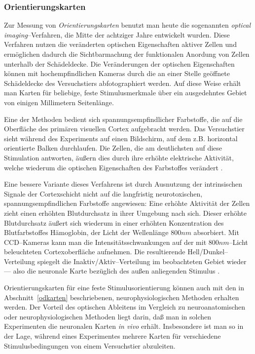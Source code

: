 \subsubsection{Orientierungskarten}

Zur Messung von \emph{Orientierungskarten} benutzt man heute die
sogenannten \emph{optical imaging}--Verfahren, die Mitte der achtziger
Jahre entwickelt wurden. Diese Verfahren nutzen die veränderten optischen
Eigenschaften aktiver Zellen und ermöglichen dadurch die Sichtbarmachung
der funktionalen Anordung von Zellen unterhalb der Schädeldecke. Die
Veränderungen der optischen Eigenschaften können mit hochempfindlichen
Kameras durch die an einer Stelle geöffnete Schädeldecke des
Versuchstiers abfotographiert werden.  Auf diese Weise erhält man Karten
für beliebige, feste Stimulusmerkmale über ein ausgedehntes Gebiet von
einigen Millimetern Seitenlänge.

Eine der Methoden bedient sich spannungsempfindlicher Farbstoffe, die auf
die Oberfläche des primären visuellen Cortex aufgebracht werden. Das
Versuchstier sieht während des Experiments auf einen Bildschirm, auf dem
z.B. horizontal orientierte Balken durchlaufen. Die Zellen, die am
deutlichsten auf diese Stimulation antworten, äußern dies durch ihre
erhöhte elektrische Aktivität, welche wiederum die optischen
Eigenschaften des Farbstoffes verändert \cite{blasdel:1986,blasdel:1992a}.

Eine bessere Variante dieses Verfahrens ist durch Ausnutzung der
intrinsischen Signale der Cortexschicht nicht auf die langfristig
neurotoxischen, spannungsempfindlichen Farbstoffe angewiesen: Eine erhöhte
Aktivität der Zellen zieht einen erhöhten Blutdurchsatz in ihrer Umgebung
nach sich. Dieser erhöhte Blutdurchsatz äußert sich wiederum in einer
erhöhten Konzentration des Blutfarbstoffes Hämoglobin, der Licht der
Wellenlänge $800nm$ absorbiert. Mit CCD--Kameras kann man die
Intensitätsschwankungen auf der mit $800nm$--Licht beleuchteten
Cortexoberfläche aufnehmen. Die resultierende Hell/Dunkel--Verteilung
spiegelt die Inaktiv/Aktiv--Verteilung im beobachteten Gebiet wieder ---
also die neuronale Karte bezüglich des außen anliegenden Stimulus
\cite{lieke:1989,grinvald:1991}.

Orientierungskarten für eine feste Stimulusorientierung können auch mit
den in Abschnitt~\ref{odkarten} beschriebenen, neurophysiologischen
Methoden erhalten werden.  Der Vorteil des optischen Ableitens im Vergleich
zu neuroanatomischen oder neurophysiologischen Methoden liegt darin, daß
man in solchen Experimenten die neuronalen Karten \emph{in vivo}
erhält. Insbesondere ist man so in der Lage, während eines Experimentes
mehrere Karten für verschiedene Stimulusbedingungen von einem Versuchstier
abzuleiten.

